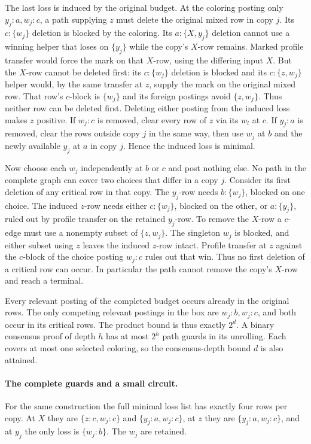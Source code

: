 The last loss is induced by the original budget.
At the coloring posting only $y_j:a,w_j:c$, a
path supplying $z$ must delete the original mixed
row in copy $j$. Its $c:\{w_j\}$ deletion is
blocked by the coloring. Its $a:\{X,y_j\}$
deletion cannot use a winning helper that loses
on $\{y_j\}$ while the copy's $X$-row remains.
Marked profile transfer would force the mark
on that $X$-row, using the differing input $X$.
But the $X$-row cannot be deleted first: its
$c:\{w_j\}$ deletion is blocked and its
$c:\{z,w_j\}$ helper would, by the same transfer
at $z$, supply the mark on the original mixed row.
That row's $c$-block is $\{w_j\}$ and its foreign
postings avoid $\{z,w_j\}$. Thus neither row can
be deleted first. Deleting either posting from
the induced loss makes $z$ positive. If $w_j:c$
is removed, clear every row of $z$ via its $w_l$
at $c$. If $y_j:a$ is removed, clear the rows
outside copy $j$ in the same way, then use $w_j$
at $b$ and the newly available $y_j$ at $a$
in copy $j$. Hence the induced loss is minimal.

Now choose each $w_j$ independently at $b$ or
$c$ and post nothing else. No path in the
complete graph can cover two choices that
differ in a copy $j$. Consider its first
deletion of any critical row in that copy.
The $y_j$-row needs $b:\{w_j\}$, blocked on
one choice. The induced $z$-row needs either
$c:\{w_j\}$, blocked on the other, or
$a:\{y_j\}$, ruled out by profile transfer on
the retained $y_j$-row. To remove the $X$-row
a $c$-edge must use a nonempty subset of
$\{z,w_j\}$. The singleton $w_j$ is blocked,
and either subset using $z$ leaves the
induced $z$-row intact. Profile transfer at
$z$ against the $c$-block of the choice
posting $w_j:c$ rules out that win. Thus no
first deletion of a critical row can occur.
In particular the path cannot remove the
copy's $X$-row and reach a terminal.

Every relevant posting of the completed
budget occurs already in the original rows.
The only competing relevant postings in the
box are $w_j:b,w_j:c$, and both occur in its
critical rows. The product bound is thus
exactly $2^d$. A binary consensus proof of
depth $h$ has at most $2^h$ path guards in its
unrolling. Each covers at most one selected
coloring, so the consensus-depth bound $d$
is also attained.

\paragraph{The complete guards and a small circuit.}
For the same construction the full minimal loss list
has exactly four rows per copy. At $X$ they are
$\{z:c,w_j:c\}$ and $\{y_j:a,w_j:c\}$, at $z$
they are $\{y_j:a,w_j:c\}$, and at $y_j$ the
only loss is $\{w_j:b\}$. The $w_j$ are retained.

